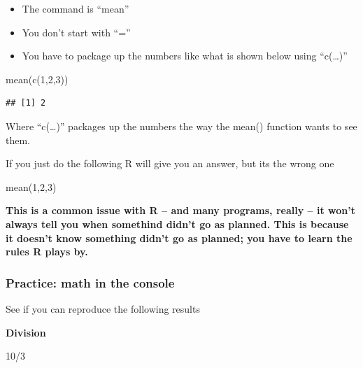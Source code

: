 \documentclass[
]{book}
\newenvironment{Shaded}{\begin{snugshade}}{\end{snugshade}}
\newcommand{\DecValTok}[1]{\textcolor[rgb]{0.00,0.00,0.81}{#1}}
\newcommand{\FunctionTok}[1]{\textcolor[rgb]{0.00,0.00,0.00}{#1}}
\newcommand{\NormalTok}[1]{#1}
\newcommand{\SpecialCharTok}[1]{\textcolor[rgb]{0.00,0.00,0.00}{#1}}
\providecommand{\tightlist}{%
  \setlength{\itemsep}{0pt}\setlength{\parskip}{0pt}}
\begin{document}
\begin{itemize}
\tightlist
\item
  The command is ``mean''
\item
  You don't start with ``=''
\item
  You have to package up the numbers like what is shown below using ``c(\ldots)''
\end{itemize}

\begin{Shaded}
\begin{Highlighting}[]
\FunctionTok{mean}\NormalTok{(}\FunctionTok{c}\NormalTok{(}\DecValTok{1}\NormalTok{,}\DecValTok{2}\NormalTok{,}\DecValTok{3}\NormalTok{))}
\end{Highlighting}
\end{Shaded}

\begin{verbatim}
## [1] 2
\end{verbatim}

Where ``c(\ldots)'' packages up the numbers the way the mean() function wants to see them.

If you just do the following R will give you an answer, but its the wrong one

\begin{Shaded}
\begin{Highlighting}[]
\FunctionTok{mean}\NormalTok{(}\DecValTok{1}\NormalTok{,}\DecValTok{2}\NormalTok{,}\DecValTok{3}\NormalTok{)}
\end{Highlighting}
\end{Shaded}

\textbf{This is a common issue with R -- and many programs, really -- it won't always tell you when somethind didn't go as planned. This is because it doesn't know something didn't go as planned; you have to learn the rules R plays by.}

\hypertarget{practice-math-in-the-console}{%
\subsubsection{Practice: math in the console}\label{practice-math-in-the-console}}

See if you can reproduce the following results

\textbf{Division}

\begin{Shaded}
\begin{Highlighting}[]
\DecValTok{10}\SpecialCharTok{/}\DecValTok{3}
\end{Highlighting}
\end{Shaded}
\end{document}

